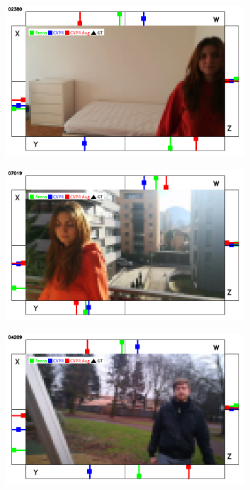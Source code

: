 \begin{figure}[H]
	\begin{center}
		\begin{subfigure}[h]{0.49\textwidth}
			\centering
			\includegraphics[width=0.98\textwidth]{"contents/images/qualitative-videos/W-bias-house01-2380"}
		\end{subfigure}
		\hfill
		\begin{subfigure}[h]{0.49\textwidth}
			\centering
			\includegraphics[width=0.98\textwidth]{"contents/images/qualitative-videos/W-bias-house01-7019"}
		\end{subfigure}
		\vfill
		\begin{subfigure}[h]{0.49\textwidth}
			\centering
			\includegraphics[width=0.98\textwidth]{"contents/images/qualitative-videos/W-bias-park01-4209"}

\end{subfigure}
\end{center}
\end{figure}
